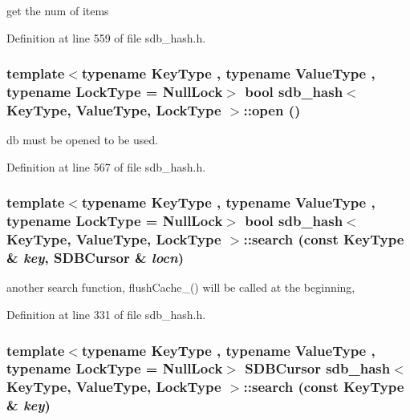 get the num of items 

Definition at line 559 of file sdb\_\-hash.h.\hypertarget{classsdb__hash_323877d8e6fb88a7ac89ff7b361dfa5c}{
\subsubsection[{open}]{\setlength{\rightskip}{0pt plus 5cm}template$<$typename KeyType , typename ValueType , typename LockType  = NullLock$>$ bool {\bf sdb\_\-hash}$<$ KeyType, ValueType, LockType $>$::open ()}}
\label{classsdb__hash_323877d8e6fb88a7ac89ff7b361dfa5c}


db must be opened to be used. 

Definition at line 567 of file sdb\_\-hash.h.\hypertarget{classsdb__hash_c229c71b533a2d90941568e6449801db}{
\subsubsection[{search}]{\setlength{\rightskip}{0pt plus 5cm}template$<$typename KeyType , typename ValueType , typename LockType  = NullLock$>$ bool {\bf sdb\_\-hash}$<$ KeyType, ValueType, LockType $>$::search (const KeyType \& {\em key}, \/  SDBCursor \& {\em locn})}}
\label{classsdb__hash_c229c71b533a2d90941568e6449801db}


another search function, flushCache\_\-() will be called at the beginning, 

Definition at line 331 of file sdb\_\-hash.h.\hypertarget{classsdb__hash_3594271208cb8aa10beca9f9f16fddd6}{
\subsubsection[{search}]{\setlength{\rightskip}{0pt plus 5cm}template$<$typename KeyType , typename ValueType , typename LockType  = NullLock$>$ SDBCursor {\bf sdb\_\-hash}$<$ KeyType, ValueType, LockType $>$::search (const KeyType \& {\em key})}}
\label{classsdb__hash_3594271208cb8aa10beca9f9f16fddd6}


